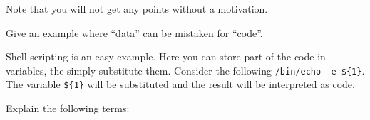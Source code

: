 \documentclass[svv,addpoints]{miunexam}
\begin{document}
\begin{questions}
  Note that you will not get any points without a motivation.


  
\question[3]\label{q:software}
Give an example where \enquote{data} can be mistaken for \enquote{code}.

\begin{solution}
  Shell scripting is an easy example.
  Here you can store part of the code in variables, the simply substitute them.
  Consider the following \texttt{/bin/echo -e \$\{1\}}.
  The variable \texttt{\$\{1\}} will be substituted and the result will be 
  interpreted as code.
\end{solution}



\question\label{q:passwd:auth:E}
  Explain the following terms:
\end{questions}
\end{document}
